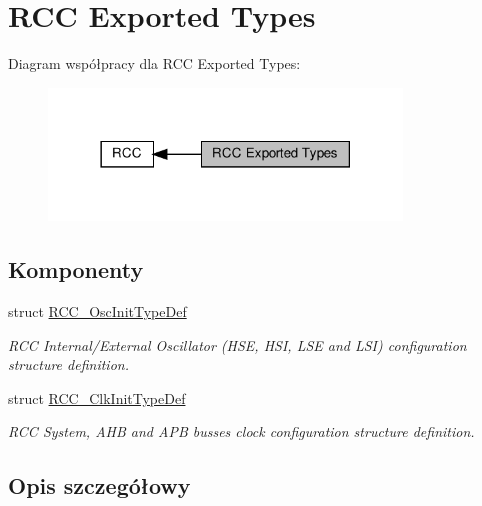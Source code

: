 \hypertarget{group___r_c_c___exported___types}{}\section{R\+CC Exported Types}
\label{group___r_c_c___exported___types}
Diagram współpracy dla R\+CC Exported Types\+:\nopagebreak
\begin{figure}[H]
\begin{center}
\leavevmode
\includegraphics[width=266pt]{group___r_c_c___exported___types}
\end{center}
\end{figure}
\subsection*{Komponenty}
\begin{DoxyCompactItemize}
\item 
struct \hyperlink{struct_r_c_c___osc_init_type_def}{R\+C\+C\+\_\+\+Osc\+Init\+Type\+Def}
\begin{DoxyCompactList}\small\item\em R\+CC Internal/\+External Oscillator (H\+SE, H\+SI, L\+SE and L\+SI) configuration structure definition. \end{DoxyCompactList}\item 
struct \hyperlink{struct_r_c_c___clk_init_type_def}{R\+C\+C\+\_\+\+Clk\+Init\+Type\+Def}
\begin{DoxyCompactList}\small\item\em R\+CC System, A\+HB and A\+PB busses clock configuration structure definition. \end{DoxyCompactList}\end{DoxyCompactItemize}


\subsection{Opis szczegółowy}
